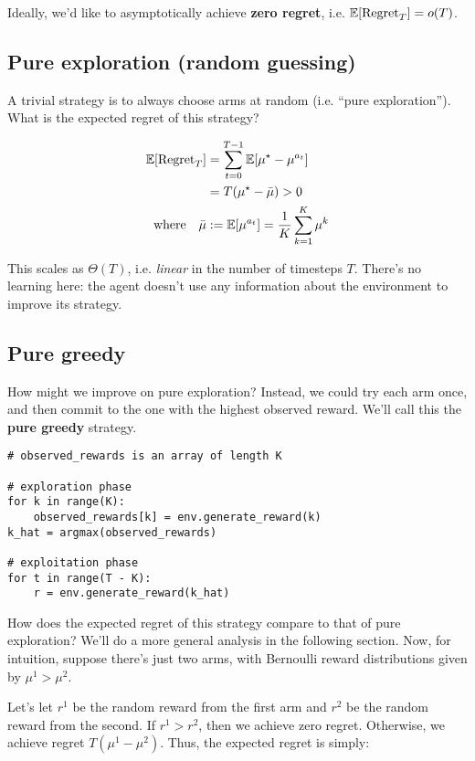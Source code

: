 \documentclass[\main/main]{subfiles}
\begin{document}
Ideally, we'd like to asymptotically achieve \textbf{zero regret}, i.e. $\operatorname*{\mathbb{E}}[\text{Regret}_T] = o(T)$.


\subsection{Pure exploration (random guessing)}

A trivial strategy is to always choose arms at random (i.e. ``pure exploration''). What is the expected regret of this strategy?

\begin{align*}
    \operatorname*{\mathbb{E}}[\text{Regret}_T] &= \sum_{t=0}^{T-1} \operatorname*{\mathbb{E}}[\mu^\star - \mu^{a_t}] \\
    &= T (\mu^\star - \bar \mu) > 0 \\
    \text{where} \quad \bar \mu &:= \operatorname*{\mathbb{E}}[\mu^{a_t}] = \frac{1}{K} \sum_{k=1}^K \mu^k
\end{align*}

This scales as $\Theta(T)$, i.e. \emph{linear} in the number of timesteps $T$. There's no learning here: the agent doesn't use any information about the environment to improve its strategy.

\subsection{Pure greedy}

How might we improve on pure exploration? Instead, we could try each arm once, and then commit to the one with the highest observed reward. We'll call this the \textbf{pure greedy} strategy.

\begin{lstlisting}
# observed_rewards is an array of length K

# exploration phase
for k in range(K):
    observed_rewards[k] = env.generate_reward(k)
k_hat = argmax(observed_rewards)

# exploitation phase
for t in range(T - K):
    r = env.generate_reward(k_hat)
\end{lstlisting}
    
How does the expected regret of this strategy compare to that of pure exploration? We'll do a more general analysis in the following section. Now, for intuition, suppose there's just two arms, with Bernoulli reward distributions given by $\mu^1 > \mu^2$.

Let's let $r^1$ be the random reward from the first arm and $r^2$ be the random reward from the second. If $r^1 > r^2$, then we achieve zero regret. Otherwise, we achieve regret $T(\mu^1 - \mu^2)$. Thus, the expected regret is simply:
\end{document}
